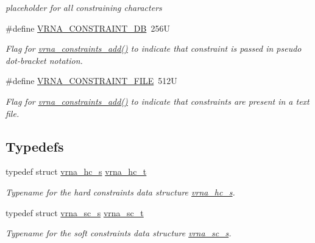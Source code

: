 \begin{DoxyCompactItemize}
\begin{DoxyCompactList}\small\item\em placeholder for all constraining characters \end{DoxyCompactList}\item 
\#define \hyperlink{group__constraints_ga4bfc2f15c4f261c62a11af9d2aa80c90}{V\+R\+N\+A\+\_\+\+C\+O\+N\+S\+T\+R\+A\+I\+N\+T\+\_\+\+D\+B}~256\+U
\begin{DoxyCompactList}\small\item\em Flag for \hyperlink{group__constraints_ga35a401f680969a556858a8dd5f1d07cc}{vrna\+\_\+constraints\+\_\+add()} to indicate that constraint is passed in pseudo dot-\/bracket notation. \end{DoxyCompactList}\item 
\#define \hyperlink{group__constraints_ga62e0ed0c33002c09423de4e646f85a2b}{V\+R\+N\+A\+\_\+\+C\+O\+N\+S\+T\+R\+A\+I\+N\+T\+\_\+\+F\+I\+L\+E}~512\+U
\begin{DoxyCompactList}\small\item\em Flag for \hyperlink{group__constraints_ga35a401f680969a556858a8dd5f1d07cc}{vrna\+\_\+constraints\+\_\+add()} to indicate that constraints are present in a text file. \end{DoxyCompactList}\end{DoxyCompactItemize}
\subsection*{Typedefs}
\begin{DoxyCompactItemize}
\item 
\hypertarget{group__constraints_gac7e4c4f8abe3163a68110c5bff24e01d}{}typedef struct \hyperlink{group__hard__constraints_structvrna__hc__s}{vrna\+\_\+hc\+\_\+s} \hyperlink{group__constraints_gac7e4c4f8abe3163a68110c5bff24e01d}{vrna\+\_\+hc\+\_\+t}\label{group__constraints_gac7e4c4f8abe3163a68110c5bff24e01d}

\begin{DoxyCompactList}\small\item\em Typename for the hard constraints data structure \hyperlink{group__hard__constraints_structvrna__hc__s}{vrna\+\_\+hc\+\_\+s}. \end{DoxyCompactList}\item 
\hypertarget{group__constraints_ga75401ce219ef8dbcceb672db82d434c6}{}typedef struct \hyperlink{group__soft__constraints_structvrna__sc__s}{vrna\+\_\+sc\+\_\+s} \hyperlink{group__constraints_ga75401ce219ef8dbcceb672db82d434c6}{vrna\+\_\+sc\+\_\+t}\label{group__constraints_ga75401ce219ef8dbcceb672db82d434c6}

\begin{DoxyCompactList}\small\item\em Typename for the soft constraints data structure \hyperlink{group__soft__constraints_structvrna__sc__s}{vrna\+\_\+sc\+\_\+s}. \end{DoxyCompactList}\end{DoxyCompactItemize}
